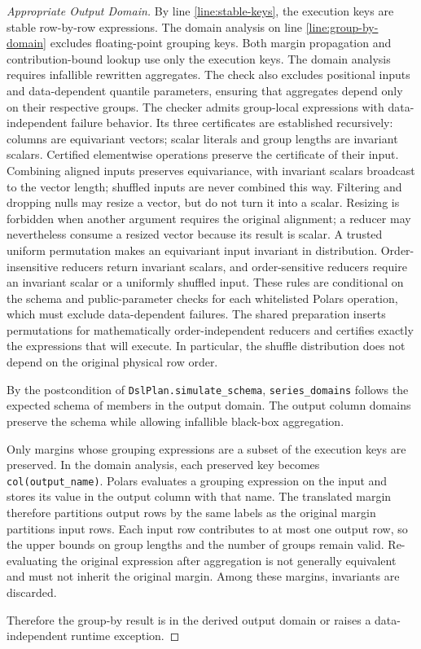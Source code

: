\documentclass{article}
\begin{document}
\begin{proof}[Appropriate Output Domain]
    By line \ref{line:stable-keys}, the execution keys are stable row-by-row expressions.
    The domain analysis on line \ref{line:group-by-domain} excludes floating-point grouping keys.
    Both margin propagation and contribution-bound lookup use only the execution keys.
    The domain analysis requires infallible rewritten aggregates.
    The check also excludes positional inputs and data-dependent quantile
    parameters, ensuring that aggregates depend only on their respective groups.
    The checker admits group-local expressions with data-independent failure behavior.
    Its three certificates are established recursively:
    columns are equivariant vectors; scalar literals and group lengths are invariant scalars.
    Certified elementwise operations preserve the certificate of their input.
    Combining aligned inputs preserves equivariance, with invariant scalars broadcast
    to the vector length; shuffled inputs are never combined this way.
    Filtering and dropping nulls may resize a vector, but do not turn it into a scalar.
    Resizing is forbidden when another argument requires the original alignment;
    a reducer may nevertheless consume a resized vector because its result is scalar.
    A trusted uniform permutation makes an equivariant input invariant in distribution.
    Order-insensitive reducers return invariant scalars, and order-sensitive reducers
    require an invariant scalar or a uniformly shuffled input.
    These rules are conditional on the schema and public-parameter checks for each
    whitelisted Polars operation, which must exclude data-dependent failures.
    The shared preparation inserts permutations for mathematically order-independent
    reducers and certifies exactly the expressions that will execute.
    In particular, the shuffle distribution does not depend on the original
    physical row order.

    By the postcondition of \texttt{DslPlan.simulate\_schema},
    \texttt{series\_domains} follows the expected schema of members in the output domain.
    The output column domains preserve the schema while allowing infallible black-box aggregation.

    Only margins whose grouping expressions are a subset of the execution keys are preserved.
    In the domain analysis, each preserved key becomes \texttt{col(output\_name)}.
    Polars evaluates a grouping expression on the input and stores its value in the output column with that name.
    The translated margin therefore partitions output rows by the same labels as the original margin partitions input rows.
    Each input row contributes to at most one output row,
    so the upper bounds on group lengths and the number of groups remain valid.
    Re-evaluating the original expression after aggregation is not generally equivalent
    and must not inherit the original margin.
    Among these margins, invariants are discarded.

    Therefore the group-by result is in the derived output domain or raises a data-independent runtime exception.
\end{proof}
\end{document}
